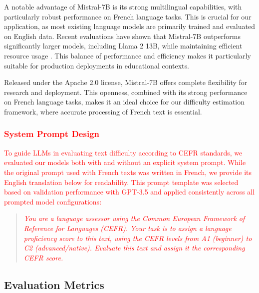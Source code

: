 A notable advantage of Mistral-7B is its strong multilingual capabilities, with particularly robust performance on French language tasks. This is crucial for our application, as most existing language models are primarily trained and evaluated on English data. Recent evaluations have shown that Mistral-7B outperforms significantly larger models, including Llama 2 13B, while maintaining efficient resource usage \cite{jindal2024birbal}. This balance of performance and efficiency makes it particularly suitable for production deployments in educational contexts.

Released under the Apache 2.0 license, Mistral-7B offers complete flexibility for research and deployment. This openness, combined with its strong performance on French language tasks, makes it an ideal choice for our difficulty estimation framework, where accurate processing of French text is essential.

\subsubsection{\textcolor{red}{System Prompt Design}}
\label{subsubsec:system_prompt}
\textcolor{red}{To guide LLMs in evaluating text difficulty according to CEFR standards, we evaluated our models both with and without an explicit system prompt. While the original prompt used with French texts was written in French, we provide its English translation below for readability. This prompt template was selected based on validation performance with GPT-3.5 and applied consistently across all prompted model configurations:}

\begin{quote}
\textcolor{red}{\textit{You are a language assessor using the Common European Framework of Reference for Languages (CEFR). Your task is to assign a language proficiency score to this text, using the CEFR levels from A1 (beginner) to C2 (advanced/native). Evaluate this text and assign it the corresponding CEFR score.}}
\end{quote}

\subsection{Evaluation Metrics}
\label{subsec:difficulty_metrics}

